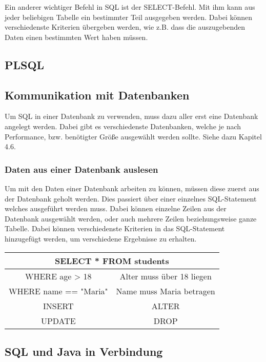 Ein anderer wichtiger Befehl in SQL ist der SELECT-Befehl. Mit ihm kann aus jeder beliebigen Tabelle ein bestimmter Teil ausgegeben werden. Dabei können verschiedenste Kriterien übergeben werden, wie z.B. dass die auszugebenden Daten einen bestimmten Wert haben müssen.
 
\subsection{PLSQL}
 
\subsection{Kommunikation mit Datenbanken}
Um SQL in einer Datenbank zu verwenden, muss dazu aller erst eine Datenbank angelegt werden. Dabei gibt es verschiedenste Datenbanken, welche je nach Performance, bzw. benötigter Größe ausgewählt werden sollte. Siehe dazu Kapitel 4.6.
 
\subsubsection{Daten aus einer Datenbank auslesen}
Um mit den Daten einer Datenbank arbeiten zu können, müssen diese zuerst aus der Datenbank geholt werden. Dies passiert über einer einzelnes SQL-Statement welches ausgeführt werden muss. Dabei können einzelne Zeilen aus der Datenbank ausgewählt werden, oder auch mehrere Zeilen beziehungsweise ganze Tabelle. Dabei können verschiedenste Kriterien in das SQL-Statement hinzugefügt werden, um verschiedene Ergebnisse zu erhalten.

\begin{center}
    \begin{tabular}{ |c|c| }
     \hline
     \multicolumn{2}{|c|}{SELECT * FROM students } \\
     \hline
     \hline
     WHERE age > 18 & Alter muss über 18 liegen \\
     \hline
     \hline
     WHERE name == "Maria" & Name muss Maria betragen  \\
     \hline
     INSERT & ALTER \\
     \hline
     UPDATE & DROP  \\
     \hline
    \end{tabular}
    \end{center}


\subsection{SQL und Java in Verbindung}